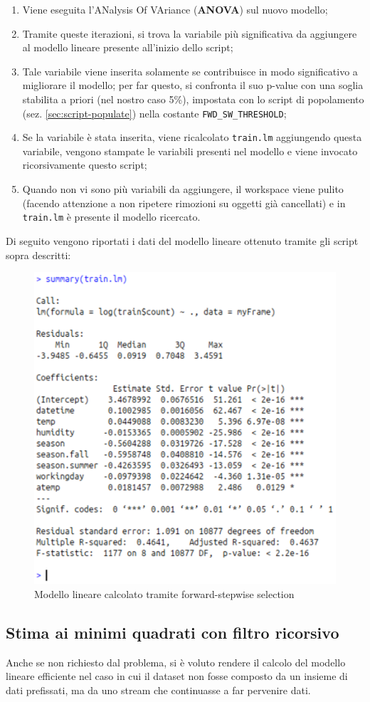 \begin{itemize}
\begin{enumerate}
  \item Viene eseguita l'ANalysis Of VAriance (\textbf{ANOVA}) sul nuovo
    modello;
  \item Tramite queste iterazioni, si trova la variabile più significativa da
    aggiungere al modello lineare presente all'inizio dello script;
  \item Tale variabile viene inserita solamente se contribuisce in modo
      significativo a migliorare il modello; per far questo, si confronta il
      suo p-value con una soglia stabilita a priori (nel nostro caso 5\%),
      impostata con lo script di popolamento (sez. \ref{sec:script-populate})
      nella costante \texttt{FWD\_SW\_THRESHOLD};
    \item Se la variabile è stata inserita, viene ricalcolato \texttt{train.lm}
      aggiungendo questa variabile, vengono stampate le variabili presenti nel
      modello e viene invocato ricorsivamente questo script;
    \item Quando non vi sono più variabili da aggiungere, il workspace viene
      pulito (facendo attenzione a non ripetere rimozioni su oggetti già
      cancellati) e in \texttt{train.lm} è presente il modello ricercato.
  \end{enumerate}
\end{itemize}

Di seguito vengono riportati i dati del modello lineare ottenuto tramite gli
script sopra descritti:

\begin{figure}[H]
  \centering
  \includegraphics[width=.55\columnwidth]{images/lm-after-fwd-steps.eps}
  \caption{Modello lineare calcolato tramite forward-stepwise selection}
    \label{fig:lm-after-fwd-steps}
\end{figure}

\subsection{Stima ai minimi quadrati con filtro ricorsivo}
Anche se non richiesto dal problema, si è voluto rendere il calcolo del
modello lineare efficiente nel caso in cui il dataset non fosse composto da un
insieme di dati prefissati, ma da uno stream che continuasse a far pervenire
dati.

